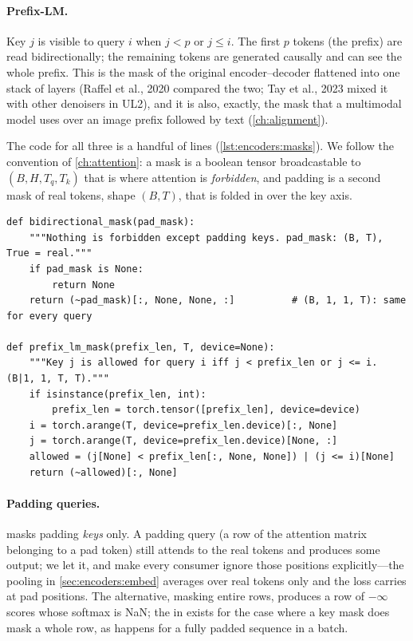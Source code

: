 \paragraph{Prefix-LM.} Key $j$ is visible to query $i$ when $j<p$ or $j\le i$. The first $p$ tokens
(the prefix) are read bidirectionally; the remaining tokens are generated causally and can see the
whole prefix. This is the mask of the original encoder--decoder flattened into one stack of layers
(Raffel et al., 2020 compared the two; Tay et al., 2023 mixed it with other denoisers in UL2), and it
is also, exactly, the mask that a multimodal model uses over an image prefix followed by text
(\cref{ch:alignment}).

The code for all three is a handful of lines (\cref{lst:encoders:masks}). We follow the convention
of \cref{ch:attention}: a mask is a boolean tensor broadcastable to $(B,H,T_q,T_k)$ that is
 where attention is \emph{forbidden}, and padding is a second mask of real tokens, shape
$(B,T)$, that is folded in over the key axis.

\begin{lstlisting}[caption={Encoder and prefix-LM masks (cf.\ \ident{llmsys/encoder.py}).},label={lst:encoders:masks}]
def bidirectional_mask(pad_mask):
    """Nothing is forbidden except padding keys. pad_mask: (B, T), True = real."""
    if pad_mask is None:
        return None
    return (~pad_mask)[:, None, None, :]          # (B, 1, 1, T): same for every query

def prefix_lm_mask(prefix_len, T, device=None):
    """Key j is allowed for query i iff j < prefix_len or j <= i. (B|1, 1, T, T)."""
    if isinstance(prefix_len, int):
        prefix_len = torch.tensor([prefix_len], device=device)
    i = torch.arange(T, device=prefix_len.device)[:, None]
    j = torch.arange(T, device=prefix_len.device)[None, :]
    allowed = (j[None] < prefix_len[:, None, None]) | (j <= i)[None]
    return (~allowed)[:, None]
\end{lstlisting}

\paragraph{Padding queries.}  masks padding \emph{keys} only. A padding
query (a row of the attention matrix belonging to a pad token) still attends to the real tokens and
produces some output; we let it, and make every consumer ignore those positions explicitly---the
pooling in \cref{sec:encoders:embed} averages over real tokens only and the loss carries
 at pad positions. The alternative, masking entire rows, produces a row of
$-\infty$ scores whose softmax is NaN; the  in  exists for the
case where a key mask does mask a whole row, as happens for a fully padded sequence in a batch.

